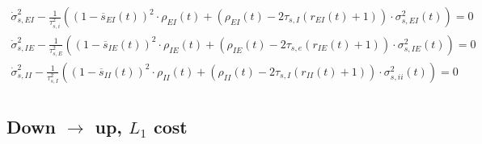 \documentclass[]{article}
\begin{document}
\begin{footnotesize}
\begin{align}
	\dot{\sigma}_{s,EI}^2- \frac{1}{\tau_{s, i}^2} \left( (1 - \overline{s}_{EI}(t))^2 \cdot \rho_{EI} (t) + (\rho_{EI} (t) - 2 \tau_{s,I} (r_{EI} (t) + 1))\cdot \sigma_{s,EI}^2(t) \right) =0 \\
	\dot{\sigma}_{s,IE}^2 - \frac{1}{\tau_{s,E}^2} \left( (1 - \overline{s}_{IE}(t))^2 \cdot \rho_{IE} (t) + (\rho_{IE} (t) - 2 \tau_{s, e} (r_{IE} (t) + 1))\cdot \sigma_{s,IE}^2(t) \right) =0 \\
	\dot{\sigma}_{s,II}^2 - \frac{1}{\tau_{s,I}^2} \left( (1 - \overline{s}_{II}(t))^2 \cdot \rho_{II} (t) + (\rho_{II} (t) - 2 \tau_{s,I} (r_{II} (t) + 1))\cdot \sigma_{s, ii}^2(t) \right) =0 \\
\end{align}
\end{footnotesize}

\subsection{Down $\rightarrow$ up, $L_1$ cost}
\end{document}
